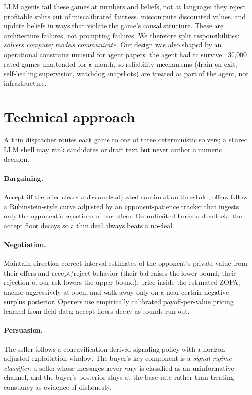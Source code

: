 \documentclass{article}
\begin{document}
LLM agents fail these games at numbers and beliefs, not at language: they reject profitable splits out of miscalibrated fairness, miscompute discounted values, and update beliefs in ways that violate the game's causal structure. These are architecture failures, not prompting failures. We therefore split responsibilities: \emph{solvers compute; models communicate}. Our design was also shaped by an operational constraint unusual for agent papers: the agent had to survive ~30{,}000 rated games unattended for a month, so reliability mechanisms (drain-on-exit, self-healing supervision, watchdog snapshots) are treated as part of the agent, not infrastructure.

\section{Technical approach}
A thin dispatcher routes each game to one of three deterministic solvers; a shared LLM shell may rank candidates or draft text but never author a numeric decision.

\paragraph{Bargaining.} Accept iff the offer clears a discount-adjusted continuation threshold; offers follow a Rubinstein-style curve adjusted by an opponent-patience tracker that ingests only the opponent's rejections of our offers. On unlimited-horizon deadlocks the accept floor decays so a thin deal always beats a no-deal.

\paragraph{Negotiation.} Maintain direction-correct interval estimates of the opponent's private value from their offers and accept/reject behavior (their bid raises the lower bound; their rejection of our ask lowers the upper bound), price inside the estimated ZOPA, anchor aggressively at open, and walk away only on a near-certain negative-surplus posterior. Openers use empirically calibrated payoff-per-value pricing learned from field data; accept floors decay as rounds run out.

\paragraph{Persuasion.} The seller follows a concavification-derived signaling policy with a horizon-adjusted exploitation window. The buyer's key component is a \emph{signal-regime classifier}: a seller whose messages never vary is classified as an uninformative channel, and the buyer's posterior stays at the base rate rather than treating constancy as evidence of dishonesty.
\end{document}
